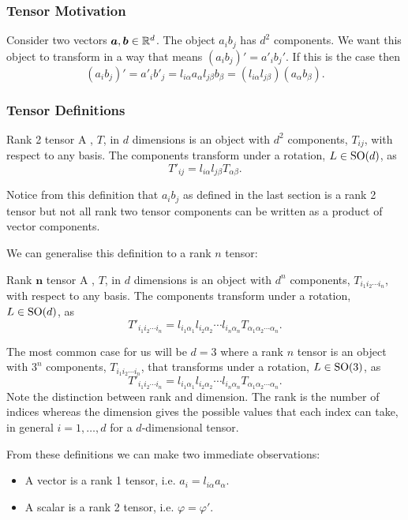 \subsubsection{Tensor Motivation}
Consider two vectors \(\bm{a}, \bm{b}\in\mathbb{R}^d\).
The object \(a_ib_j\) has \(d^2\) components.
We want this object to transform in a way that means \((a_ib_j)' = a'_ib_j'\).
If this is the case then
\[(a_ib_j)' = a'_ib'_j = l_{i\alpha}a_\alpha l_{j\beta}b_{\beta} = (l_{i\alpha}l_{j\beta})(a_\alpha b_\beta).\]

\subsubsection{Tensor Definitions}
\begin{definition}{Rank 2 tensor}{}
    A , \(T\), in \(d\) dimensions is an object with \(d^2\) components, \(T_{ij}\), with respect to any basis.
    The components transform under a rotation, \(L\in\mathrm{SO}(d)\), as
    \[T'_{ij} = l_{i\alpha}l_{j\beta}T_{\alpha\beta}.\]
\end{definition}
Notice from this definition that \(a_ib_j\) as defined in the last section is a rank 2 tensor but not all rank two tensor components can be written as a product of vector components.

We can generalise this definition to a rank \(n\) tensor:
\begin{definition}{Rank \(\bm{n}\) tensor}{}
    A , \(T\), in \(d\) dimensions is an object with \(d^n\) components, \(T_{i_1i_2\dotsm i_n}\), with respect to any basis.
    The components transform under a rotation, \(L\in\mathrm{SO}(d)\), as
    \[T'_{i_1i_2\dotsm i_n} = l_{i_1\alpha_1}l_{i_2\alpha_2}\dotsm l_{i_n\alpha_n}T_{\alpha_1\alpha_2\dotsm\alpha_n}.\]
\end{definition}
The most common case for us will be \(d = 3\) where a rank \(n\) tensor is an object with \(3^n\) components, \(T_{i_1i_2\dotsm i_n}\), that transforms under a rotation, \(L\in\mathrm{SO}(3)\), as
\[T'_{i_1i_2\dotsm i_n} = l_{i_1\alpha_1}l_{i_2\alpha_2}\dotsm l_{i_n\alpha_n}T_{\alpha_1\alpha_2\dotsm\alpha_n}.\]
Note the distinction between rank and dimension.
The rank is the number of indices whereas the dimension gives the possible values that each index can take, in general \(i = 1, \dotsc, d\) for a \(d\)-dimensional tensor.

From these definitions we can make two immediate observations:
\begin{itemize}
    \item A vector is a rank 1 tensor, i.e. \(a_i = l_{i\alpha}a_{\alpha}\).
    \item A scalar is a rank 2 tensor, i.e. \(\varphi = \varphi'\).
\end{itemize}

